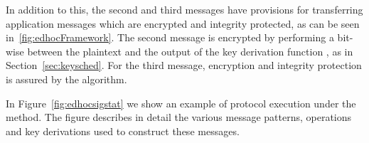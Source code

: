 In addition to this, the second and third messages have
provisions for transferring application messages which are encrypted and
integrity protected, as can be seen in~\ref{fig:edhocFramework}.
%
The second message is encrypted by performing a bit-wise \mXor{} between
the plaintext and the output of the key derivation function \mHkdf{}, as
in Section~\ref{sec:keysched}.
%
For the third message, encryption and integrity protection is assured by the
\mAead{} algorithm.
%

In Figure~\ref{fig:edhocsigstat} we show an example of protocol execution
under
the \mSigStat{} method.
%
The figure describes in detail the various message patterns, operations and
key derivations used to construct these messages.
%
\begin{figure}[ht]
\centering
{}
\end{figure}
